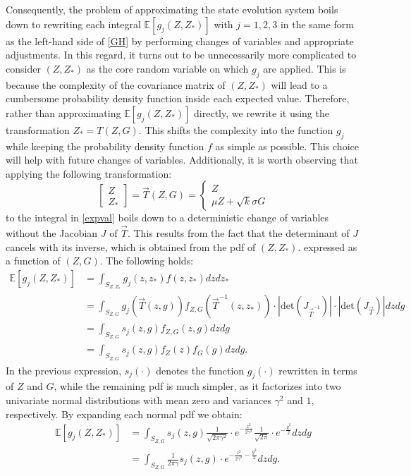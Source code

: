 \documentclass{article}
\begin{document}
Consequently, the problem of approximating the state evolution system boils down to rewriting each integral $\mathbb{E}[g_j(Z,Z_*)]$ with $j=1,2,3$ in the same form as the left-hand side of \eqref{GH} by performing changes of variables and appropriate adjustments. In this regard, it turns out to be unnecessarily more complicated to consider $(Z,Z_*)$ as the core random variable on which $g_j$ are applied. This is because the complexity of the covariance matrix of  $(Z,Z_*)$ will lead to a cumbersome probability density function inside each expected value. Therefore, rather than approximating $\mathbb{E}[g_j(Z, Z_*)]$ directly, we rewrite it using the transformation $Z_* = T(Z, G)$. This shifts the complexity into the function $g_j$ while keeping the probability density function $f$ as simple as possible. This choice will help with future changes of variables. Additionally, it is worth observing that applying the following transformation:
\begin{equation*}
\begin{bmatrix}
Z\\
Z_{*}
\end{bmatrix}=\vec{T}(Z,G)=\begin{cases}
Z\\
\mu Z+\sqrt{k}\sigma G
\end{cases}
\end{equation*}
to the integral in \eqref{expval}
boils down to a deterministic change of variables without the Jacobian $J$ of $\vec{T}$. This results from the fact that the determinant of $J$ cancels with its inverse, which is obtained from the pdf of $(Z,Z_*)$. expressed as a function of $(Z,G)$. The following holds:
\begin{align*}
\mathbb{E}[g_j(Z,Z_*)]&=\int_{S_{Z,Z_*}}g_j(z,z_*)f(z,z_*)dzdz_*\\
&=\int_{S_{Z,G}}g_j(\vec{T}(z,g))f_{Z,G}(\vec{T}^{-1}(z,z_*))\cdot|\text{det}(J_{\vec{T}^{-1}})|\cdot|\text{det}(J_{\vec{T}}) |dzdg\\
&=\int_{S_{Z,G}}s_j(z,g)f_{Z,G}(z,g)dzdg\\
&=\int_{S_{Z,G}}s_j(z,g)f_Z(z)f_G(g)dzdg.
\end{align*}
In the previous expression, $s_j(\cdot)$ denotes the function $g_j(\cdot)$ rewritten in terms of $Z$ and $G$, while the remaining pdf is much simpler, as it factorizes into two univariate normal distributions with mean zero and variances $\gamma^2$ and $1$, respectively. By expanding each normal pdf we obtain:
\begin{align*}
\mathbb{E}[g_j(Z,Z_*)]&=\int_{S_{Z,G}}s_j(z,g)\frac{1}{\sqrt{2\pi\gamma^2}}\cdot e^{\displaystyle-\frac{z^2}{2\gamma^2}}\frac{1}{\sqrt{2\pi}}\cdot e^{\displaystyle-\frac{g^2}{2}}dzdg\\
&=\int_{S_{Z,G}}\frac{1}{2\pi\gamma}s_j(z,g)\cdot e^{\displaystyle-\frac{z^2}{2\gamma^2}-\frac{g^2}{2}}dzdg.
\end{align*}
\end{document}
